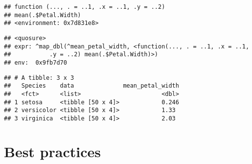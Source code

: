 \documentclass[]{book}
\newenvironment{Shaded}{\begin{snugshade}}{\end{snugshade}}
\newcommand{\DataTypeTok}[1]{\textcolor[rgb]{0.13,0.29,0.53}{#1}}
\newcommand{\KeywordTok}[1]{\textcolor[rgb]{0.13,0.29,0.53}{\textbf{#1}}}
\newcommand{\NormalTok}[1]{#1}
\newcommand{\OperatorTok}[1]{\textcolor[rgb]{0.81,0.36,0.00}{\textbf{#1}}}
\newcommand{\StringTok}[1]{\textcolor[rgb]{0.31,0.60,0.02}{#1}}
\begin{document}
\begin{Shaded}
\end{Shaded}

\begin{verbatim}
## function (..., . = ..1, .x = ..1, .y = ..2) 
## mean(.$Petal.Width)
## <environment: 0x7d831e8>
\end{verbatim}

\begin{Shaded}
\end{Shaded}

\begin{verbatim}
## <quosure>
## expr: ^map_dbl(^mean_petal_width, <function(..., . = ..1, .x = ..1,
##           .y = ..2) mean(.$Petal.Width)>)
## env:  0x9fb7d70
\end{verbatim}

\begin{Shaded}
\end{Shaded}

\begin{verbatim}
## # A tibble: 3 x 3
##   Species    data              mean_petal_width
##   <fct>      <list>                       <dbl>
## 1 setosa     <tibble [50 x 4]>            0.246
## 2 versicolor <tibble [50 x 4]>            1.33 
## 3 virginica  <tibble [50 x 4]>            2.03
\end{verbatim}

\hypertarget{best-practices}{%
\chapter{Best practices}\label{best-practices}}
\end{document}
